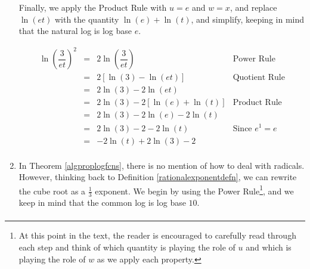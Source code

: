 \documentclass{ximera}
\begin{document}
\begin{ex}
\begin{enumerate}
Finally, we apply the Product Rule with $u=e$ and $w=x$, and replace $\ln(et)$ with the quantity $\ln(e) + \ln(t)$, and simplify, keeping in mind that the natural log is log base $e$.

\setlength{\extrarowheight}{6pt}
\[ \begin{array}{rclr}

\ln \left(\dfrac{3}{et}\right)^2 & = & 2 \ln \left(\dfrac{3}{et}\right) & \mbox{Power Rule} \\
                                 & = & 2 \left[ \ln(3) - \ln(et) \right] & \mbox{Quotient Rule} \\
                                 & = & 2 \ln(3) - 2\ln(et) & \\
                                 & = & 2 \ln(3) - 2\left[\ln(e) + \ln(t)\right] & \mbox{Product Rule} \\
                                 & = & 2 \ln(3) - 2\ln(e) - 2 \ln(t) & \\
                                 & = & 2\ln(3) - 2 - 2 \ln(t) & \mbox{Since $e^{1} = e$} \\
                                 & = & - 2 \ln(t) + 2\ln(3) - 2 & \\
\end{array}\]
\setlength{\extrarowheight}{2pt}
                        

\item In Theorem \ref{algproplogfcns}, there is no mention of how to deal with radicals.  However, thinking back to Definition \ref{rationalexponentdefn}, we can rewrite the cube root as a $\frac{1}{3}$ exponent.  We begin by using the Power Rule\footnote{At this point in the text, the reader is encouraged to carefully read through each step and think of which quantity is playing the role of $u$ and which is playing the role of $w$ as we apply each property.}, and we keep in mind that the common log is log base $10$. 
\setlength{\extrarowheight}{6pt}
\[ \begin{array}{rclr}


\end{array}\]
\end{enumerate}
\end{ex}
\end{document}
